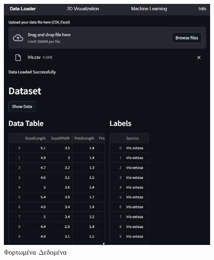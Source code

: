 \documentclass{article}
\begin{document}
\begin{figure}[h!]
  \centering
  \includegraphics[width=0.6\textheight]{photos/loaded_data.png}
  \caption{Φορτωμένα Δεδομένα}
  \label{fig:Loaded Data}
\end{figure}

\newpage
\end{document}
